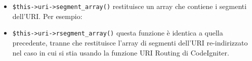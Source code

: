 \begin{itemize}
\item \verb|$this->uri->segment_array()| restituisce un array che contiene i segmenti dell'URI. Per esempio:


\item \verb|$this->uri->rsegment_array()| questa funzione è identica a quella precedente, tranne che restituisce l'array di segmenti dell'URI re-indirizzato nel caso in cui si stia usando la funzione URI Routing di CodeIgniter.
\end{itemize}